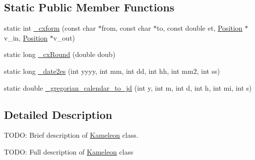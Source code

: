 \subsection*{Static Public Member Functions}
\begin{DoxyCompactItemize}
\item 
static int \hyperlink{classccmc_1_1_kameleon_aaba6fb209c74149abf0568a0bcc39eb0}{\-\_\-cxform} (const char $\ast$from, const char $\ast$to, const double et, \hyperlink{structccmc_1_1_position}{Position} $\ast$v\-\_\-in, \hyperlink{structccmc_1_1_position}{Position} $\ast$v\-\_\-out)
\item 
static long \hyperlink{classccmc_1_1_kameleon_a1a62777efd8c88c07464d9bc39a02539}{\-\_\-cx\-Round} (double doub)
\item 
static long \hyperlink{classccmc_1_1_kameleon_addc547b1295af71ad1998cdbd5bcca4a}{\-\_\-date2es} (int yyyy, int mm, int dd, int hh, int mm2, int ss)
\item 
static double \hyperlink{classccmc_1_1_kameleon_ad9096349d4e123699dd9926595f5efcc}{\-\_\-gregorian\-\_\-calendar\-\_\-to\-\_\-jd} (int y, int m, int d, int h, int mi, int s)
\end{DoxyCompactItemize}


\subsection{Detailed Description}
T\-O\-D\-O\-: Brief description of \hyperlink{classccmc_1_1_kameleon}{Kameleon} class. 

T\-O\-D\-O\-: Full description of \hyperlink{classccmc_1_1_kameleon}{Kameleon} class 

